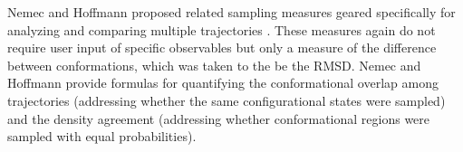 Nemec and Hoffmann proposed related sampling measures geared specifically for analyzing and comparing multiple trajectories \cite{Nemec2017}.
These measures again do not require user input of specific observables but only a measure of the difference between conformations, which was taken to the be the RMSD.
Nemec and Hoffmann provide formulas for quantifying the conformational overlap among trajectories (addressing whether the same configurational states were sampled) and the density agreement (addressing whether conformational regions were  sampled with equal probabilities).


